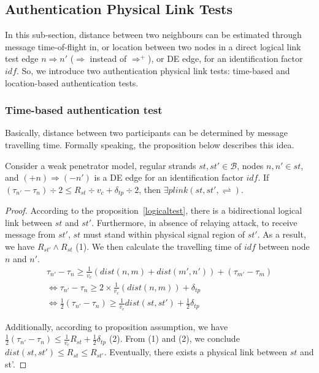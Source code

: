 \subsection{Authentication Physical Link Tests}

In this sub-section, distance between two neighbours can be estimated through message time-of-flight in, or location between two nodes in a direct logical link test edge $n \Rightarrow n'$ ($\Rightarrow$ instead of $\Rightarrow^+$), or DE edge, for an identification factor $idf$. So, we introduce two authentication physical link tests: time-based and location-based authentication tests. 

\subsubsection*{Time-based authentication test}

Basically, distance between two participants can be determined by message travelling time. Formally speaking, the proposition below describes this idea.

\begin{Proposition}\label{difrange}
Consider a weak penetrator model, regular strands $st, st' \in \mathcal{B}$, nodes $n,n' \in st$, and $(+n) \Rightarrow (-n')$ is a DE edge for an identification factor $idf$. If $(\tau_{n'} - \tau_{n})\div 2 \le R_{st} \div v_c + \delta_{tp} \div 2$, then $\exists plink(st,st',\rightleftharpoons)$. 
\end{Proposition}

\begin{proof}

According to the proposition~\ref{logicaltest}, there is a bidirectional logical link between $st$ and $st'$. Furthermore, in absence of relaying attack, to receive message from $st'$, $st$ must stand within physical signal region of $st'$. As a result, we have $R_{st'} \wedge R_{st}$ (1). We then calculate the travelling time of $idf$ between node $n$ and $n'$. 
\begin{equation*}
\begin{split}
  	 \tau_{n'} - \tau_{n} \ge \frac 1 {v_c}(dist(n,m) + dist(m', n')) + (\tau_{m'} - \tau_{m}) \\ \Leftrightarrow 
	 \tau_{n'} - \tau_{n} \ge 2 \times \frac 1 {v_c}(dist(n,m)) + \delta_{tp} \\ \Leftrightarrow 
	 \frac 1 {2} (\tau_{n'} - \tau_{n}) \ge \frac 1 {v_c} dist(st,st') + \frac 1 {2} \delta_{tp} 
\end{split}
\end{equation*}

Additionally, according to proposition assumption, we have $ \frac 1 {2} (\tau_{n'} - \tau_{n}) \le \frac 1 {v_c} R_{st} + \frac 1 {2} \delta_{tp} $ (2). From (1) and (2), we conclude $dist(st,st') \le R_{st} \le R_{st'} $. Eventually, there exists a physical link between $st$ and st'.
\end{proof}

